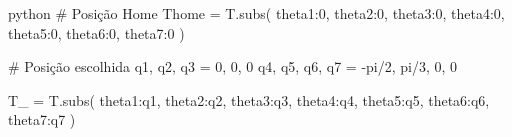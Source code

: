 \begin{mintedbox}{python}
# Posição Home
Thome = T.subs({ theta1:0, theta2:0, theta3:0, theta4:0, theta5:0, theta6:0, theta7:0 })

# Posição escolhida
q1, q2, q3     = 0, 0, 0
q4, q5, q6, q7 = -pi/2, pi/3, 0, 0

T_ = T.subs({ theta1:q1, theta2:q2, theta3:q3, theta4:q4, theta5:q5, theta6:q6, theta7:q7 })
\end{mintedbox}